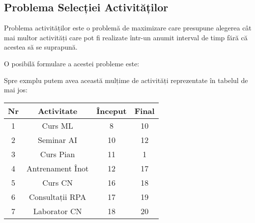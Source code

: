 \subsection{Problema Selecției Activităților}	
Problema activităților este o problemă de maximizare care presupune alegerea cât mai multor activități care pot fi realizate într-un anumit interval de timp fără că acestea să se suprapună.
\vspace{0.5cm}
\par	 
O posibilă formulare a acestei probleme este: \par
{}
\par
\vspace{1cm}
Spre exmplu putem avea această mulțime de activități reprezentate în tabelul de mai jos:
\begin{table}[h!]
	\centering
	\begin{tabular}{||c c c c||} 
		\hline
		Nr & Activitate & Început & Final \\ [1ex] 
		\hline\hline
		1 & Curs ML & 8 & 10\\ \hline
		2 & Seminar AI & 10 & 12 \\\hline
		3 & Curs Pian & 11 & 1 \\\hline
		4 & Antrenament Înot & 12 & 17 \\ \hline
		5 & Curs CN & 16 & 18 \\\hline
		6 & Consultații RPA & 17 & 19 \\ \hline
		7 & Laborator CN & 18 & 20 \\ [1ex] 
		\hline
	\end{tabular}
\end{table}
